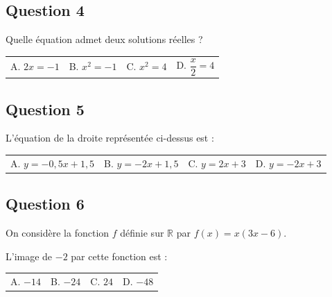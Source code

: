 \documentclass[10pt]{article}
\begin{document}
\vspace{.8em}

\subsection*{Question 4}

Quelle équation admet deux solutions réelles ?
\begin{center}
\begin{tabularx}{.92\linewidth}{XXXX} A. $2x=-1$ & B. $x^2=-1$ & C. $x^2=4$ & D. $\dfrac{x}{2}=4$\end{tabularx}
\end{center}


\subsection*{Question 5}

\begin{center}
\end{center}

L'équation de la droite représentée ci-dessus est :
\begin{center}
\begin{tabularx}{.92\linewidth}{XXXX} A. $y=-0,5x+1,5$ & B. $y=-2x+1,5$ & C. $y=2x+3$ & D. $y=-2x+3$\end{tabularx}
\end{center}

\vspace{.8em}

\subsection*{Question 6}

On considère la fonction $f$ définie sur $\mathbb{R}$ par $f(x)=x(3x-6)$.\par
L'image de $-2$ par cette fonction est :
\begin{center}
\begin{tabularx}{.92\linewidth}{XXXX} A. $-14$ & B. $-24$ & C. $24$ & D. $-48$\end{tabularx}
\end{center}
\end{document}
